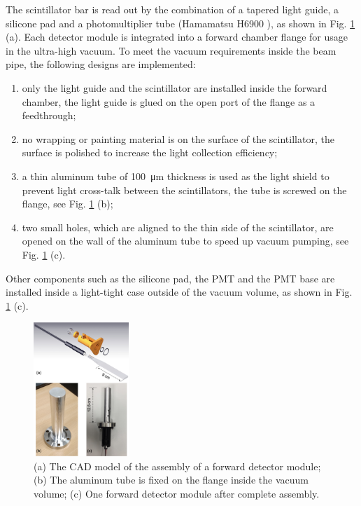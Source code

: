 \documentclass[number,5p]{elsarticle}
\begin{document}
The scintillator bar is read out by the combination of a tapered light guide, a silicone pad and a
photomultiplier tube (Hamamatsu H6900 \cite{hamamatsu}), as shown in Fig. \ref{fig:forward_module} (a).
Each detector module is integrated into a forward chamber flange for usage
in the ultra-high vacuum.
To meet the vacuum requirements inside the beam pipe, the following designs are implemented:
\begin{enumerate}
\item only the light guide and the scintillator are installed inside the forward chamber, the light guide is glued on the open port of the flange as a feedthrough;
\item no wrapping or painting material is on the surface of the scintillator, the
  surface is polished to increase the light collection efficiency;
\item a thin aluminum tube of \SI{100}{\micro\meter} thickness is used as
  the light shield to prevent light cross-talk between the scintillators, the tube is screwed on the flange, see Fig. \ref{fig:forward_module} (b);
\item two small holes, which are aligned to the thin side of the scintillator, are opened on the wall of the aluminum tube to speed up vacuum pumping, see Fig. \ref{fig:forward_module} (c).
\end{enumerate}
Other components such as the silicone pad, the PMT and the PMT base are
installed inside a light-tight case outside of the vacuum volume, as shown in Fig. \ref{fig:forward_module} (c).
\begin{figure}[htbp]
  \centering
  \includegraphics[width=0.32\textwidth]{./forward_module.png}
  \caption{(a) The CAD model of the assembly of a forward detector module; (b) The
    aluminum tube is fixed on the flange inside the vacuum volume; (c) One forward detector module after complete assembly.}
  \label{fig:forward_module}
\end{figure}
\end{document}
